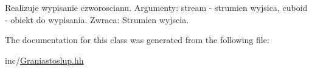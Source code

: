 Realizuje wypisanie czworoscianu. Argumenty\+: stream -\/ strumien wyjsica, cuboid -\/ obiekt do wypisania. Zwraca\+: Strumien wyjscia. 

The documentation for this class was generated from the following file\+:\begin{DoxyCompactItemize}
\item 
inc/\mbox{\hyperlink{_graniastoslup_8hh}{Graniastoslup.\+hh}}\end{DoxyCompactItemize}

